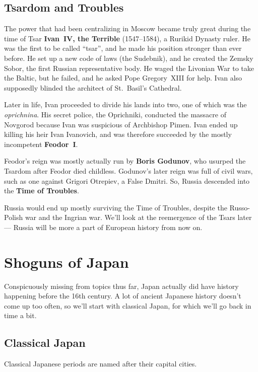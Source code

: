 \subsection*{Tsardom and Troubles}

The power that had been centralizing in Moscow became truly great during the time of
Tsar \textbf{Ivan~IV, the Terrible} (1547--1584), a Rurikid Dynasty ruler.
He was the first to be called ``tsar'', and he made his position stronger than ever before.
He set up a new code of laws (the Sudebnik), and he created the Zemsky Sobor, the first Russian representative body.
He waged the Livonian War to take the Baltic, but he failed, and he asked Pope Gregory~XIII for help.
Ivan also supposedly blinded the architect of St.\ Basil's Cathedral.

Later in life, Ivan proceeded to divide his lands into two, one of which was the \textit{oprichnina}.
His secret police, the Oprichniki, conducted the massacre of Novgorod because Ivan was suspicious of Archbishop Pimen.
Ivan ended up killing his heir Ivan Ivanovich,
and was therefore succeeded by the mostly incompetent \textbf{Feodor~I}.

Feodor's reign was mostly actually run by \textbf{Boris Godunov},
who usurped the Tsardom after Feodor died childless.
Godunov's later reign was full of civil wars, such as one against Grigori Otrepiev, a False Dmitri.
So, Russia descended into the \textbf{Time of Troubles}.

Russia would end up mostly surviving the Time of Troubles, despite the Russo-Polish war and the Ingrian war.
We'll look at the reemergence of the Tsars later --- Russia will be more a part of European history from now on.

\section{Shoguns of Japan}

Conspicuously missing from topics thus far,
Japan actually did have history happening before the 16th century.
A lot of ancient Japanese history doesn't come up too often,
so we'll start with classical Japan, for which we'll go back in time a bit.

\subsection*{Classical Japan}

Classical Japanese periods are named after their capital cities.

